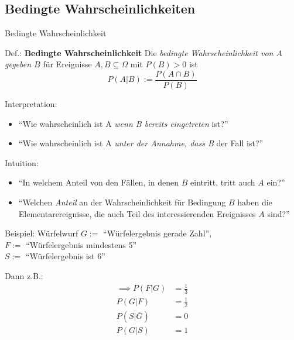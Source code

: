 \documentclass[
  10pt,
  ignorenonframetext,
]{beamer}
\providecommand{\tightlist}{%
  \setlength{\itemsep}{0pt}\setlength{\parskip}{0pt}}
\begin{document}
\hypertarget{bedingte-wahrscheinlichkeiten}{%
\subsection{Bedingte
Wahrscheinlichkeiten}\label{bedingte-wahrscheinlichkeiten}}

\begin{frame}{Bedingte Wahrscheinlichkeit}
\protect\hypertarget{bedingte-wahrscheinlichkeit}{}
\begin{block}{Def.: \textbf{Bedingte Wahrscheinlichkeit}}
\protect\hypertarget{def.-bedingte-wahrscheinlichkeit}{}
Die \emph{bedingte Wahrscheinlichkeit von \(A\) gegeben \(B\)} für
Ereignisse \(A, B \subseteq \Omega\) mit \(P(B) > 0\) ist
\[P(A|B) := \frac {P(A \cap B)}{P(B)}\]
\end{block}

Interpretation:

\begin{itemize}
\tightlist
\item
  ``Wie wahrscheinlich ist A \emph{wenn B bereits eingetreten} ist?''
\item
  ``Wie wahrscheinlich ist A \emph{unter der Annahme, dass B} der Fall
  ist?''
\end{itemize}

Intuition:

\begin{itemize}
\tightlist
\item
  ``In welchem Anteil von den Fällen, in denen \(B\) eintritt, tritt
  auch \(A\) ein?''
\item
  ``Welchen \emph{Anteil} an der Wahrscheinlichkeit für Bedingung \(B\)
  haben die Elementarereignisse, die auch Teil des interessierenden
  Ereignisses \(A\) sind?''
\end{itemize}

\end{frame}

\begin{frame}{Beispiel: Würfelwurf}
\protect\hypertarget{beispiel-wuxfcrfelwurf}{}
\(G:=\) ``Würfelergebnis gerade Zahl'',\\
\(F:=\) ``Würfelergebnis mindestens 5''\\
\(S:=\) ``Würfelergebnis ist 6''

Dann z.B.: \begin{align*}
\implies P(F|G) &= \frac{1}{3}\\
 P(G|F) &= \frac{1}{2} \\
 P(S|\bar G) &= 0 \\ 
 P(G|S) &= 1 \\
\end{align*}
\end{frame}
\end{document}
